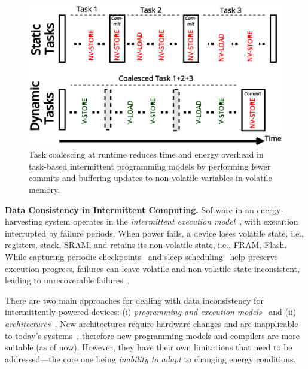 \begin{figure}
	\includegraphics[width=0.9\columnwidth]{figures/coalescing-horiz}
    \caption{\label{fig:coalesce}Task coalescing at runtime reduces time and
energy overhead in task-based intermittent programming models by performing
fewer commits and buffering updates to non-volatile variables in volatile
memory.}
\end{figure}

\textbf{Data Consistency in Intermittent Computing.} Software in an energy-harvesting system operates in the {\em intermittent execution model}~\cite{dino,lucia_snapl_2017}, with execution interrupted by failure periods. When power fails, a device loses volatile state, i.e., registers, stack, SRAM, and retains its non-volatile state, i.e., FRAM, Flash. While capturing periodic checkpoints~\cite{mementos,quickrecall} and sleep scheduling~\cite{dewdrop,hibernus,hibernusplusplus} help preserve execution progress, failures can leave volatile and non-volatile state inconsistent, leading to unrecoverable failures~\cite{dino,edb}. 

There are two main approaches for dealing with data inconsistency for intermittently-powered devices: (i) \emph{programming and execution models}~\cite{dino,ratchet,chain,alpaca} and (ii) \emph{architectures}~\cite{hicks_isca_2017,idetic,nvp,tictpl}. New architectures require hardware changes and are inapplicable to today's systems~\cite{hicks_isca_2017,nvp}, therefore new programming models and compilers are more suitable (as of now). However, they have their own limitations that need to be addressed---the core one being \emph{inability to adapt} to changing energy conditions.

